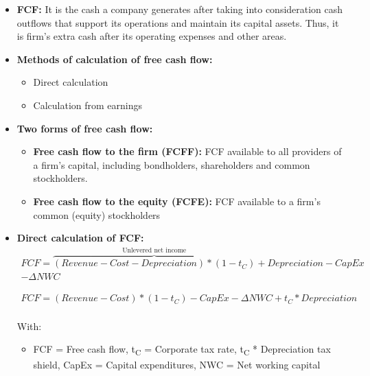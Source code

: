 \documentclass[ieeetran]{article}
\begin{document}
\begin{itemize}
  \item \textbf{FCF:} It is the cash a company generates after taking into consideration cash outflows that support its operations and maintain its capital assets. Thus, it is firm's extra cash after its operating expenses and other areas.

  \item \textbf{Methods of calculation of free cash flow:}
	  \begin{itemize}
	    \item Direct calculation
	\item Calculation from earnings
	  \end{itemize}

\item \textbf{Two forms of free cash flow:}
	\begin{itemize}
	  \item \textbf{Free cash flow to the firm (FCFF):} FCF available to all providers of a firm's capital, including bondholders, shareholders and common stockholders.
	  \item \textbf{Free cash flow to the equity (FCFE):} FCF available to a firm's common (equity) stockholders
	\end{itemize}

\item \textbf{Direct calculation of FCF:}
	\large
	\begin{equation*}
	\boxed{
	\begin{aligned}
	FCF = \overbrace{(Revenue - Cost - Depreciation) * (1 - t_C)}^\text{Unlevered net income} + Depreciation - CapEx \\
	- \Delta NWC
	\end{aligned}
	}
	\end{equation*}
	\normalsize

	\large
	\begin{equation*}
	\boxed{
	\begin{aligned}
	FCF = (Revenue - Cost) * (1 - t_C) -CapEx - \Delta NWC + t_C * Depreciation
	\end{aligned}
	}
	\end{equation*}
	\\
	\normalsize
	With:
	\begin{itemize}
		\item FCF = Free cash flow, t\textsubscript{C} = Corporate tax rate, t\textsubscript{C} * Depreciation tax shield, CapEx = Capital expenditures, NWC = Net working capital
	\end{itemize}


\end{itemize}
\end{document}
